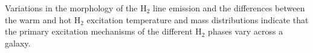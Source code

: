 \documentclass[manuscript]{aastex}
\begin{document}
Variations in the morphology of the $\mathrm{H_2}$ line emission and the differences between the warm and hot $\mathrm{H_2}$ excitation temperature and mass distributions indicate that the primary excitation mechanisms of the different $\mathrm{H_2}$ phases vary across a galaxy.  
\end{document}
